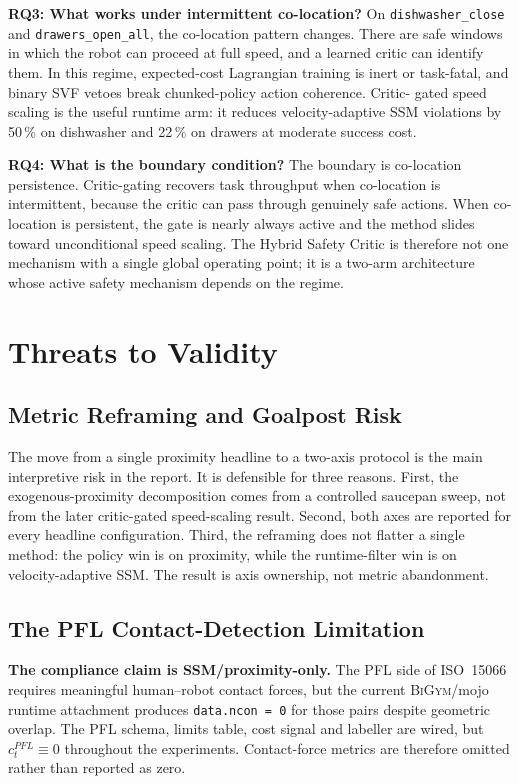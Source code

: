 \documentclass[11pt,a4paper]{report}
\newcommand{\ssm}{SSM}
\newcommand{\pfl}{PFL}
\newcommand{\iso}{ISO~15066}
\newcommand{\bigym}{\textsc{BiGym}}
\begin{document}
\textbf{RQ3: What works under intermittent co-location?} On
\texttt{dishwasher\_close} and \texttt{drawers\_open\_all}, the
co-location pattern changes. There are safe windows in which the robot
can proceed at full speed, and a learned critic can identify them. In
this regime, expected-cost Lagrangian training is inert or task-fatal,
and binary SVF vetoes break chunked-policy action coherence. Critic-
gated speed scaling is the useful runtime arm: it reduces
velocity-adaptive \ssm{} violations by 50\,\% on dishwasher and
22\,\% on drawers at moderate success cost.

\textbf{RQ4: What is the boundary condition?} The boundary is
co-location persistence. Critic-gating recovers task throughput when
co-location is intermittent, because the critic can pass through
genuinely safe actions. When co-location is persistent, the gate is
nearly always active and the method slides toward unconditional speed
scaling. The Hybrid Safety Critic is therefore not one mechanism with a
single global operating point; it is a two-arm architecture whose
active safety mechanism depends on the regime.

\section{Threats to Validity}
\label{sec:disc:threats}

\subsection{Metric Reframing and Goalpost Risk}
\label{sec:disc:metric-reframe}

The move from a single proximity headline to a two-axis protocol is the
main interpretive risk in the report. It is defensible for three
reasons. First, the exogenous-proximity decomposition comes from a
controlled saucepan sweep, not from the later critic-gated speed-scaling
result. Second, both axes are reported for every headline
configuration. Third, the reframing does not flatter a single method:
the policy win is on proximity, while the runtime-filter win is on
velocity-adaptive \ssm{}. The result is axis ownership, not metric
abandonment.

\subsection{The \pfl{} Contact-Detection Limitation}
\label{sec:disc:pfl-bug}

\textbf{The compliance claim is \ssm{}/proximity-only.} The \pfl{} side
of \iso{} requires meaningful human--robot contact forces, but the
current \bigym{}/mojo runtime attachment produces
\texttt{data.ncon = 0} for those pairs despite geometric overlap. The
\pfl{} schema, limits table, cost signal and labeller are wired, but
$c^{\pfl}_t \equiv 0$ throughout the experiments. Contact-force
metrics are therefore omitted rather than reported as zero.
\end{document}
